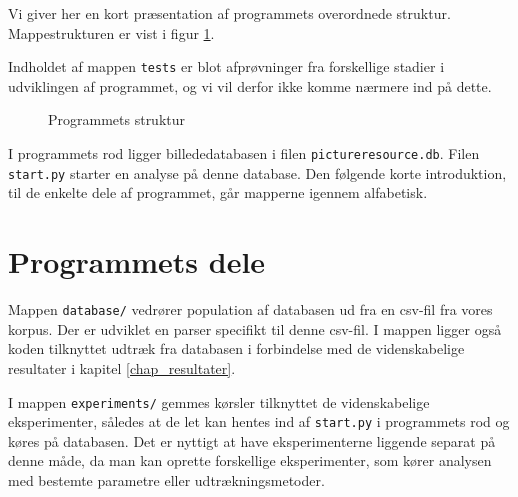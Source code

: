 {
Vi giver her en kort præsentation af programmets overordnede
struktur. Mappestrukturen er vist i figur \ref{program_struktur}.

Indholdet af mappen \texttt{tests} er blot afprøvninger fra forskellige
stadier i udviklingen af programmet, og vi vil derfor ikke komme nærmere
ind på dette.

\begin{figure}[!h]
    \caption[]{Programmets struktur}
    \label{program_struktur}
\end{figure}

I programmets rod ligger billededatabasen i filen
\texttt{pictureresource.db}. Filen \texttt{start.py} starter en analyse
på denne database. Den følgende korte introduktion, til de enkelte dele
af programmet, går mapperne igennem alfabetisk.

\section{Programmets dele}

\vspace{1.4em}
\vspace{1.4em}
Mappen \texttt{database/} vedrører population af databasen ud fra en
csv-fil fra vores korpus. Der er udviklet en parser specifikt til denne
csv-fil. I mappen ligger også koden tilknyttet udtræk fra databasen
i forbindelse med de videnskabelige resultater i kapitel
\ref{chap_resultater}.

\vspace{1.4em}
\vspace{1.4em}

I mappen \texttt{experiments/} gemmes kørsler tilknyttet de
videnskabelige eksperimenter, således at de let kan hentes ind af
\texttt{start.py} i programmets rod og køres på databasen. Det er
nyttigt at have eksperimenterne liggende separat på denne måde, da man
kan oprette forskellige eksperimenter, som kører analysen med bestemte
parametre eller udtrækningsmetoder.

\vspace{1.4em}
\vspace{1.4em}

}
